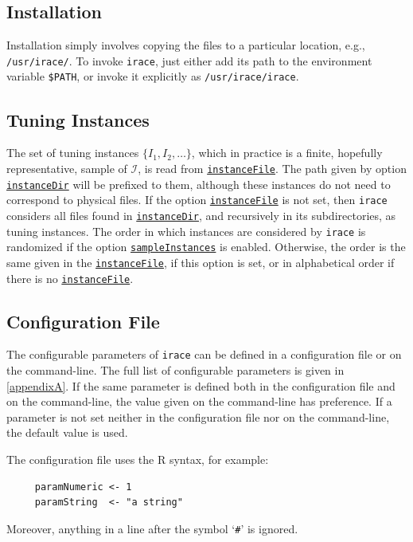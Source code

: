 \documentclass[a4paper]{article}
\newcommand{\irace}{\texttt{irace}\xspace}
\newcommand{\aR}{\textsf{R}\xspace}
\newcommand{\parameter}[1]{\hyperlink{opt:#1}{\texttt{#1}}}
\begin{document}
\subsection{Installation}

Installation simply involves copying the files to a particular
location, e.g., \texttt{/usr/irace/}. To invoke \irace, just either
add its path to the environment variable \verb|$PATH|, or invoke it
explicitly as \texttt{/usr/irace/irace}.




\subsection{Tuning Instances}\label{sec:instances}

The set of tuning instances $\{I_1, I_2, \dotsc\}$, which in
practice is a finite, hopefully representative, sample of
$\mathcal{I}$, is read from \parameter{instanceFile}. The path given
by option \parameter{instanceDir} will be prefixed to them, although
these instances do not need to correspond to physical files. If the
option \parameter{instanceFile} is not set, then \irace considers all
files found in \parameter{instanceDir}, and recursively in its
subdirectories, as tuning instances. The order in which instances
are considered by \irace is randomized if the
option \parameter{sampleInstances} is enabled. Otherwise, the order is
the same given in the \parameter{instanceFile}, if this option is set,
or in alphabetical order if there is no \parameter{instanceFile}.

\subsection{Configuration File}\label{sec:configFile}
 
The configurable parameters of \irace can be defined in a
configuration file or on the command-line. The full list of
configurable parameters is given in
\autoref{appendixA}. If the same parameter is defined
both in the configuration file and on the command-line, the value
given on the command-line has preference. If a parameter is not set
neither in the configuration file nor on the command-line, the default
value is used.

The configuration file uses the \aR syntax, for example:
%
\begin{verbatim}
     paramNumeric <- 1
     paramString  <- "a string"
\end{verbatim}
%
Moreover, anything in a line after the symbol `\texttt{\#}' is ignored.
\end{document}
